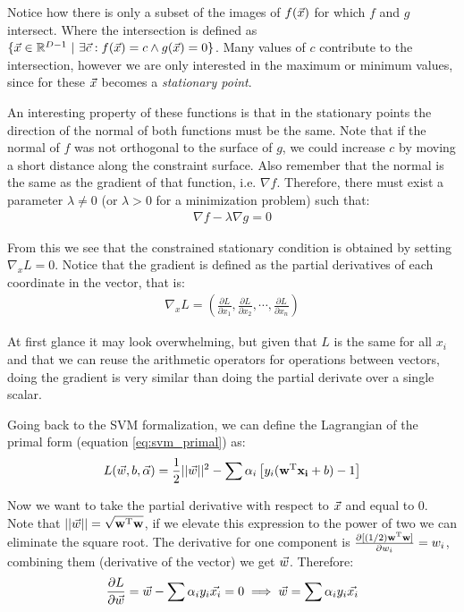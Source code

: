 Notice how there is only a subset of the images of $f(\vec{x})$ for which $f$ and $g$ inter\-sect. Where the intersection is defined as $\{\vec{x} \in \mathbb{R}^{D-1}\ |\ \exists \vec{c} : f(\vec{x}) = c \land g(\vec{x}) = 0\}$. Many values of $c$ contribute to the intersection, however we are only interested in the maximum or minimum values, since for these $\vec{x}$ becomes a \emph{stationary point}.

An interesting property of these functions is that in the stationary points the di\-rec\-tion of the normal of both functions must be the same. Note that if the normal of $f$ was not orthogonal to the surface of $g$, we could increase $c$ by moving a short distance along the constraint surface. Also remember that the normal is the same as the gradient of that function, i.e. $\nabla f$. Therefore, there must exist a parameter $\lambda \neq 0$ (or $\lambda > 0$ for a minimization problem) such that:
\begin{align}
    \nabla f - \lambda \nabla g = 0
\end{align}

From this we see that the constrained stationary condition is obtained by setting $\nabla_x L = 0$. Notice that the gradient is defined as the partial derivatives of each coordinate in the vector, that is:
\begin{align*}
    \nabla_x L = \left( \frac{\partial L}{\partial x_1}, \frac{\partial L}{\partial x_2}, \cdots, \frac{\partial L}{\partial x_n} \right)
\end{align*}

At first glance it may look overwhelming, but given that $L$ is the same for all $x_i$ and that we can reuse the arithmetic operators for operations between vectors, doing the gradient is very similar than doing the partial derivate over a single scalar. 

Going back to the SVM formalization, we can define the Lagrangian of the primal form (equation \ref{eq:svm_primal}) as:
\begin{align}\label{eq:svm_lagrangian_from_primal}
    L(\vec{w}, b, \vec{\alpha}) = \frac{1}{2} ||\vec{w}||^2 - \sum \alpha_i \left[ y_i (\mathbf{w}^{\text{T}} \mathbf{x_i} + b) - 1\right]
\end{align}

Now we want to take the partial derivative with respect to $\vec{x}$ and equal to 0. Note that $||\vec{w}|| = \sqrt{\mathbf{w}^{\text{T}}\mathbf{w}}$, if we elevate this expression to the power of two we can eliminate the square root. The derivative for one component is $\frac{\partial [(1/2)\mathbf{w}^{\text{T}}\mathbf{w}]}{\partial w_i} = w_i$, combining them (derivative of the vector) we get $\vec{w}$. Therefore:
\begin{align}\label{eq:svm_representer}
    \frac{\partial L}{\partial \vec{w}} = \vec{w} - \sum \alpha_i y_i \vec{x_i} = 0 \implies \vec{w} = \sum \alpha_i y_i \vec{x_i}
\end{align}

